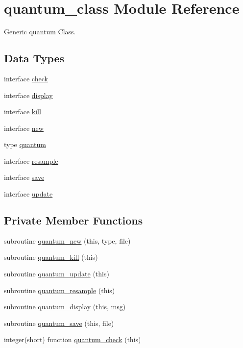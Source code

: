 \hypertarget{classquantum__class}{\section{quantum\+\_\+class Module Reference}
\label{classquantum__class}
}


Generic quantum Class.  


\subsection*{Data Types}
\begin{DoxyCompactItemize}
\item 
interface \hyperlink{interfacequantum__class_1_1check}{check}
\item 
interface \hyperlink{interfacequantum__class_1_1display}{display}
\item 
interface \hyperlink{interfacequantum__class_1_1kill}{kill}
\item 
interface \hyperlink{interfacequantum__class_1_1new}{new}
\item 
type \hyperlink{structquantum__class_1_1quantum}{quantum}
\item 
interface \hyperlink{interfacequantum__class_1_1resample}{resample}
\item 
interface \hyperlink{interfacequantum__class_1_1save}{save}
\item 
interface \hyperlink{interfacequantum__class_1_1update}{update}
\end{DoxyCompactItemize}
\subsection*{Private Member Functions}
\begin{DoxyCompactItemize}
\item 
subroutine \hyperlink{classquantum__class_a3170f42702712b16bcc152509752f18e}{quantum\+\_\+new} (this, type, file)
\item 
subroutine \hyperlink{classquantum__class_a1c73725245a04e63092d2152579c4bd9}{quantum\+\_\+kill} (this)
\item 
subroutine \hyperlink{classquantum__class_afef9cff48e6cd580f47a06f4adc4109b}{quantum\+\_\+update} (this)
\item 
subroutine \hyperlink{classquantum__class_a496266b0eb772dd0e7d8ce9d8439945a}{quantum\+\_\+resample} (this)
\item 
subroutine \hyperlink{classquantum__class_a163174aa7cc6ae0a03b2269c55ca05b8}{quantum\+\_\+display} (this, msg)
\item 
subroutine \hyperlink{classquantum__class_aa60138cf5e19494d1f29b63053b32f24}{quantum\+\_\+save} (this, file)
\item 
integer(short) function \hyperlink{classquantum__class_a7ed38fd0b1d221dd04ca645722602f7d}{quantum\+\_\+check} (this)
\end{DoxyCompactItemize}


